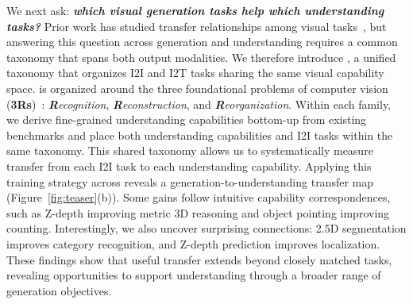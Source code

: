 We next ask: \textbf{\textit{which visual generation tasks help which understanding tasks?}}
Prior work has studied transfer relationships among visual tasks~\citep{zamir2018taskonomy},
but answering this question across generation and understanding requires a common taxonomy that spans both output modalities.
We therefore introduce \methodname, a unified taxonomy that organizes I2I and I2T tasks sharing the same visual capability space.
\methodname is organized around the three foundational problems of computer vision (\textbf{3Rs})~\citep{malik2016three}: 
\textit{\textbf{R}ecognition}, \textit{\textbf{R}econstruction}, and \textit{\textbf{R}eorganization}.
Within each family, we derive fine-grained understanding capabilities bottom-up from existing benchmarks and place both understanding capabilities and I2I tasks within the same taxonomy.
This shared taxonomy allows us to systematically measure transfer from each I2I task to each understanding capability.
Applying this training strategy across \methodname reveals a generation-to-understanding transfer map (Figure~\ref{fig:teaser}(b)).
Some gains follow intuitive capability correspondences, such as Z-depth improving metric 3D reasoning and object pointing improving counting.
Interestingly, we also uncover surprising connections:
2.5D segmentation improves category recognition, and Z-depth prediction
improves localization. These findings show that useful transfer extends beyond closely matched tasks, revealing opportunities to support understanding through a broader range of generation objectives.

